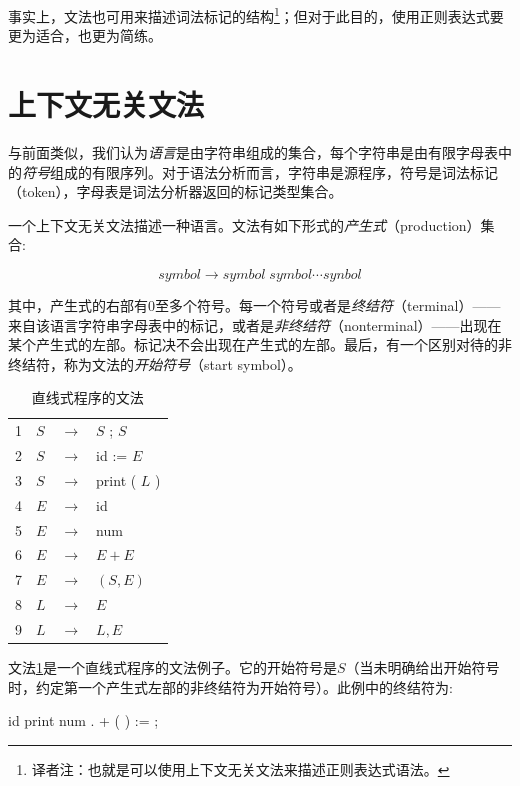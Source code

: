 \documentclass[cn,11pt,chinese]{elegantbook}
\begin{document}
事实上，文法也可用来描述词法标记的结构\footnote{译者注：也就是可以使用上下文无关文法来描述正则表达式语法。}；但对于此目的，使用正则表达式要更为适合，也更为简练。

\section{上下文无关文法}

与前面类似，我们认为\textit{语言}是由字符串组成的集合，每个字符串是由有限字母表中的\textit{符号}组成的有限序列。对于语法分析而言，字符串是源程序，符号是词法标记（token），字母表是词法分析器返回的标记类型集合。

一个上下文无关文法描述一种语言。文法有如下形式的\textit{产生式}（production）集合: 

$$
symbol \rightarrow symbol \; symbol \cdots synbol
$$

其中，产生式的右部有0至多个符号。每一个符号或者是\textit{终结符}（terminal）——来自该语言字符串字母表中的标记，或者是\textit{非终结符}（nonterminal）——出现在某个产生式的左部。标记决不会出现在产生式的左部。最后，有一个区别对待的非终结符，称为文法的\textit{开始符号}（start symbol）。

\renewcommand\tablename{文法}
\begin{table}[htbp]
  \centering
  \begin{tabular}{llll}
  \toprule
  1 & $S$ & $\rightarrow$ & $S$ ; $S$ \\
  2 & $S$ & $\rightarrow$ & id := $E$ \\
  3 & $S$ & $\rightarrow$ & print ( $L$ ) \\
  \midrule
  4 & $E$ & $\rightarrow$ & id \\
  5 & $E$ & $\rightarrow$ & num \\
  6 & $E$ & $\rightarrow$ & $E+E$ \\
  7 & $E$ & $\rightarrow$ & $(S,E)$ \\
  \midrule
  8 & $L$ & $\rightarrow$ & $E$ \\
  9 & $L$ & $\rightarrow$ & $L,E$ \\
  \bottomrule
  \end{tabular}
  \caption{直线式程序的文法}\label{grammar:3-1}
\end{table}
\renewcommand\tablename{表}

文法\ref{grammar:3-1}是一个直线式程序的文法例子。它的开始符号是$S$（当未明确给出开始符号时，约定第一个产生式左部的非终结符为开始符号）。此例中的终结符为:

id print num . + ( ) := ;
\end{document}
